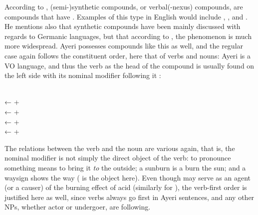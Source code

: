 According to \citet{bauer2001}, (semi-)synthetic compounds, or verbal(-nexus)
compounds, are compounds that have . Examples of this type in English would include
, , and . He mentions also 
that synthetic compounds have been mainly discussed with regards to Germanic
languages, but that according to \citet[3608]{lieber1994}, the phenomenon is
much more widespread. Ayeri possesses compounds like this as well, and the
regular case again follows the constituent order, here that of verbs and nouns:
Ayeri is a VO language, and thus the verb as the head of the compound is
usually found on the left side with its nominal modifier following it
\citep[129--133]{gaeta2008}:

\pex
	\a {} \\
		← 
		+ 
	\a {} \\
		← 
		+ 
	\a {} \\
		← 
		+ 
	\a {} \\
		← 
		+ 
\xe

The relations between the verb and the noun are various again, that is, the 
nominal modifier is not simply the direct object of the verb: to pronounce 
something means to bring it \emph{to} the outside; a sunburn is a burn 
 the sun; and a waysign shows the way ( is
the object here). Even though  may serve as an agent (or a
causer) of the burning effect of acid (similarly for
), the verb-first order is justified here as
well, since verbs always go first in Ayeri sentences, and any other NPs,
whether actor or undergoer, are following.%

